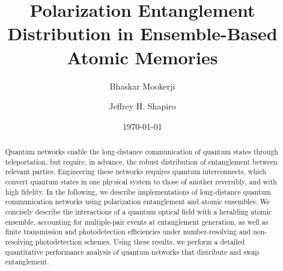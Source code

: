 \documentclass[aps,twocolumn,secnumarabic,amsmath,amssymb,pra,groupedaddress,
showpacs, showkeys,draft]{revtex4-1}
\begin{document}

\title{Polarization Entanglement Distribution in Ensemble-Based Atomic Memories}



\author{Bhaskar Mookerji}
\author{Jeffrey H. Shapiro}


\date{\today}

\begin{abstract}

  Quantum networks enable the long-distance communication of quantum states
  through teleportation, but require, in advance, the robust distribution of
  entanglement between relevant parties. Engineering these networks requires
  quantum interconnects, which convert quantum states in one physical system to
  those of another reversibly, and with high fidelity. In the following, we
  describe implementations of long-distance quantum communication networks
  using polarization entanglement and atomic ensembles. We concisely describe
  the interactions of a quantum optical field with a heralding atomic ensemble,
  accounting for multiple-pair events at entanglement generation, as well as
  finite transmission and photodetection efficiencies under number-resolving
  and non-resolving photodetection schemes. Using these results, we perform a
  detailed quantitative performance analysis of quantum networks that
  distribute and swap entanglement.

\end{abstract}
\end{document}
